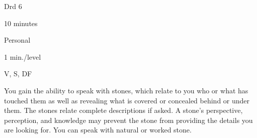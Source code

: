 
\begin{description*}
\item[Level:] Drd 6
\item[Casting Time:] 10 minutes
\item[Range:] Personal
\item[Duration:] 1 min./level
\item[Components:] V, S, DF
\end{description*}

You gain the ability to speak with stones, which relate to you who or what has
touched them as well as revealing what is covered or concealed behind or under
them. The stones relate complete descriptions if asked. A stone's perspective,
perception, and knowledge may prevent the stone from providing the details you
are looking for.
You can speak with natural or worked stone.